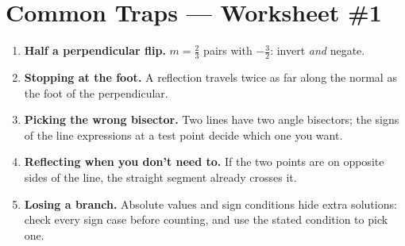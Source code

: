 \documentclass[11pt,a4paper]{article}
\begin{document}
\section*{Common Traps --- Worksheet \#1}
\begin{enumerate}[leftmargin=2em,itemsep=4pt]
  \item \textbf{Half a perpendicular flip.} $m=\tfrac23$ pairs with $-\tfrac32$: invert \emph{and} negate. 
  \item \textbf{Stopping at the foot.} A reflection travels twice as far along the normal as the foot of the perpendicular. 
  \item \textbf{Picking the wrong bisector.} Two lines have two angle bisectors; the signs of the line expressions at a test point decide which one you want. 
  \item \textbf{Reflecting when you don't need to.} If the two points are on opposite sides of the line, the straight segment already crosses it. 
  \item \textbf{Losing a branch.} Absolute values and sign conditions hide extra solutions: check every sign case before counting, and use the stated condition to pick one. 
\end{enumerate}

\end{document}
